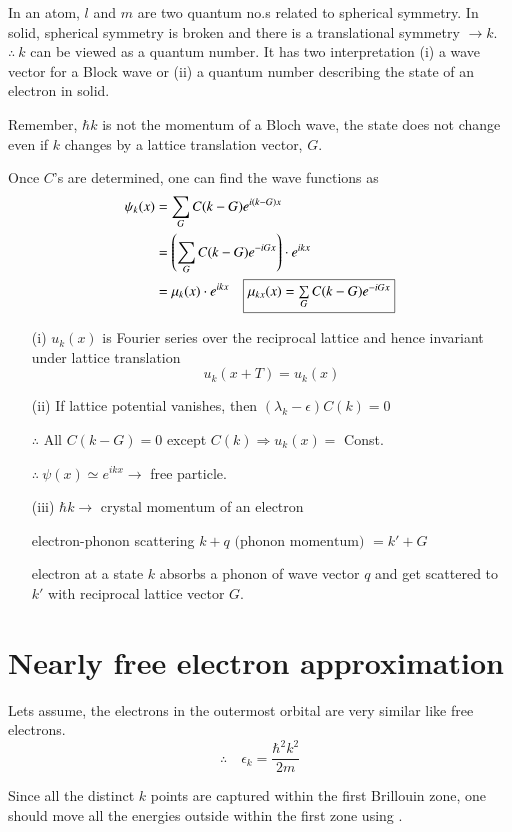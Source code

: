 In an atom, $l$ and $m$ are two quantum no.s related to spherical symmetry. In solid, spherical symmetry is broken and there is a translational symmetry $\to k$. $\therefore \ k$ can be viewed as a quantum number. It has two interpretation (i) a wave vector for a Block wave or (ii) a quantum number describing the state of an electron in solid.

Remember, $\hbar k$ is not the momentum of a Bloch wave, the state does not change even if $k$ changes by a lattice translation vector, $G$.

Once $C$'s are determined, one can find the wave functions as
\begin{align*}
\psi_{k}(x) &= \sum\limits_{G}C(k-G)e^{i(k-G)x}\\
&= \left(\sum\limits_{G}C(k-G)e^{-iGx}\right)\cdot e^{ikx}\\
&= \mu_{k}(x)\cdot e^{ikx}\quad \fbox{$\mu_{kx}(x)=\sum\limits_{G}C(k-G)e^{-iGx}$}
\end{align*}
\begin{itemize}
\item[(i)] $u_{k}(x)$ is Fourier series over the reciprocal lattice and hence invariant under lattice translation
$$
u_{k}(x+T)=u_{k}(x)
$$

\item[(ii)] If lattice potential vanishes, then $(\lambda_{k}-\epsilon)C(k)=0$

$\therefore$ All $C(k-G)=0$ except $C(k)\Rightarrow u_{k}(x)=$ Const.

$\therefore \ \psi(x)\simeq e^{ikx}\to$ free particle.

\item[(iii)] $\hbar k\to$ crystal momentum of an electron

electron-phonon scattering $k+q \text{ (phonon momentum) } = k'+G$

electron at a state $k$ absorbs a phonon of wave vector $q$ and get scattered to $k'$ with reciprocal lattice vector $G$.
\end{itemize}

\section*{Nearly free electron approximation}

Lets assume, the electrons in the outermost orbital are very similar like free electrons.
$$
\therefore\quad \epsilon_{k}=\dfrac{\hbar^{2}k^{2}}{2m}
$$

Since all the distinct $k$ points are captured within the first Brillouin zone, one should move all the energies outside within the first zone using .

